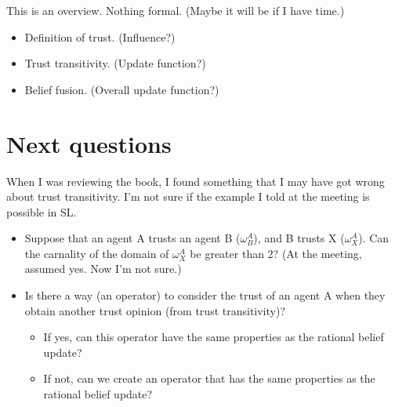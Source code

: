 \documentclass[a4paper,12pt]{article}
\theoremstyle{definition}
\numberwithin{equation}{section}
\begin{document}
This is an overview. Nothing formal. (Maybe it will be if I have time.)

\begin{itemize}
	\item Definition of trust. (Influence?)
	
	\item Trust transitivity. (Update function?)
	
	\item Belief fusion. (Overall update function?)
\end{itemize}

\section{Next questions}

When I was reviewing the book, I found something that I may have got wrong about trust transitivity. I'm not sure if the example I told at the meeting is possible in SL.

\begin{itemize}
	\item Suppose that an agent A trusts an agent B ($\omega^A_B$), and B trusts X ($\omega^A_X$). Can the carnality of the domain of $\omega^A_X$ be greater than 2? (At the meeting, assumed yes. Now I'm not sure.)
	
	\item Is there a way (an operator) to consider the trust of an agent A when they obtain another trust opinion (from trust transitivity)?
	
	\begin{itemize}
		\item If yes, can this operator have the same properties as the rational belief update?
		
		\item If not, can we create an operator that has the same properties as the rational belief update?
	\end{itemize}
\end{itemize}
\end{document}
